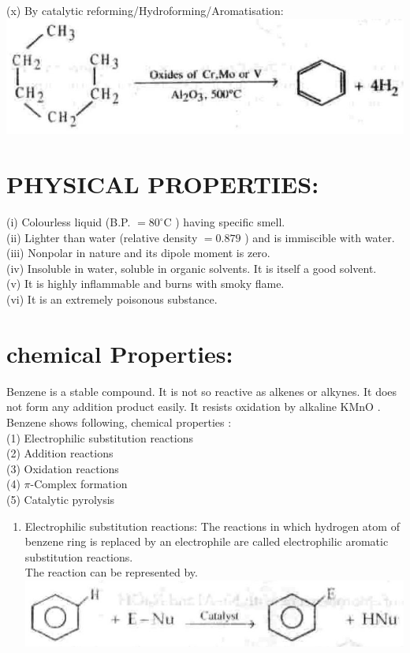 \documentclass[10pt]{article}
\begin{document}
(x) By catalytic reforming/Hydroforming/Aromatisation:\\
\includegraphics[max width=\textwidth, center]{2025_01_28_8470952b98110cec3aabg-205(4)}

\section*{PHYSICAL PROPERTIES:}
(i) Colourless liquid (B.P. $=80^{\circ} \mathrm{C}$ ) having specific smell.\\
(ii) Lighter than water (relative density $=0.879$ ) and is immiscible with water.\\
(iii) Nonpolar in nature and its dipole moment is zero.\\
(iv) Insoluble in water, soluble in organic solvents. It is itself a good solvent.\\
(v) It is highly inflammable and burns with smoky flame.\\
(vi) It is an extremely poisonous substance.

\section*{chemical Properties:}
Benzene is a stable compound. It is not so reactive as alkenes or alkynes. It does not form any addition product easily. It resists oxidation by alkaline KMnO . Benzene shows following, chemical properties :\\
(1) Electrophilic substitution reactions\\
(2) Addition reactions\\
(3) Oxidation reactions\\
(4) $\pi$-Complex formation\\
(5) Catalytic pyrolysis

\begin{enumerate}
  \item Electrophilic substitution reactions: The reactions in which hydrogen atom of benzene ring is replaced by an electrophile are called electrophilic aromatic substitution reactions.\\
The reaction can be represented by.\\
\includegraphics[max width=\textwidth, center]{2025_01_28_8470952b98110cec3aabg-206(1)}
\end{enumerate}
\end{document}
